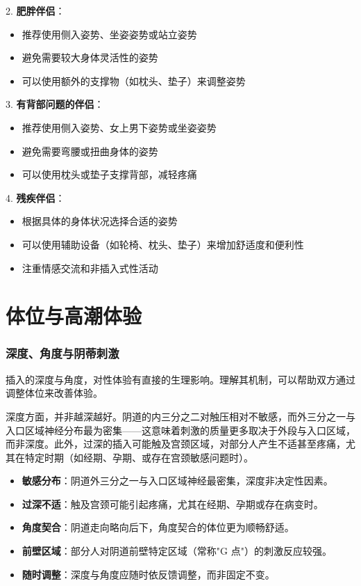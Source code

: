 \documentclass[12pt,UTF8]{ctexbook}
\newcommand{\keyword}[1]{\textbf{#1}}
\begin{document}
2. \textbf{肥胖伴侣}：
  \begin{itemize}
  \item 推荐使用侧入姿势、坐姿姿势或站立姿势
  \item 避免需要较大身体灵活性的姿势
  \item 可以使用额外的支撑物（如枕头、垫子）来调整姿势
  \end{itemize}

3. \textbf{有背部问题的伴侣}：
  \begin{itemize}
  \item 推荐使用侧入姿势、女上男下姿势或坐姿姿势
  \item 避免需要弯腰或扭曲身体的姿势
  \item 可以使用枕头或垫子支撑背部，减轻疼痛
  \end{itemize}

4. \textbf{残疾伴侣}：
  \begin{itemize}
  \item 根据具体的身体状况选择合适的姿势
  \item 可以使用辅助设备（如轮椅、枕头、垫子）来增加舒适度和便利性
  \item 注重情感交流和非插入式性活动
  \end{itemize}

\chapter{体位与高潮体验}

\subsection{深度、角度与阴蒂刺激}

插入的深度与角度，对性体验有直接的生理影响。理解其机制，可以帮助双方通过调整体位来改善体验。

深度方面，并非越深越好。阴道的内三分之二对触压相对不敏感，而外三分之一与入口区域神经分布最为密集——这意味着刺激的质量更多取决于外段与入口区域，而非深度。此外，过深的插入可能触及宫颈区域，对部分人产生不适甚至疼痛，尤其在特定时期（如经期、孕期、或存在宫颈敏感问题时）。

\begin{itemize}
  \item \keyword{敏感分布}：阴道外三分之一与入口区域神经最密集，深度非决定性因素。
  \item \keyword{过深不适}：触及宫颈可能引起疼痛，尤其在经期、孕期或存在病变时。
  \item \keyword{角度契合}：阴道走向略向后下，角度契合的体位更为顺畅舒适。
  \item \keyword{前壁区域}：部分人对阴道前壁特定区域（常称"G 点"）的刺激反应较强。
  \item \keyword{随时调整}：深度与角度应随时依反馈调整，而非固定不变。
\end{itemize}
\end{document}
